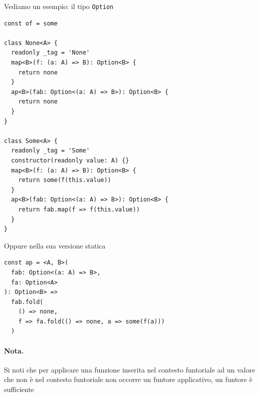 \documentclass[12pt]{article}
\begin{document}
Vediamo un esempio: il tipo \texttt{Option}

\begin{verbatim}
const of = some

class None<A> {
  readonly _tag = 'None'
  map<B>(f: (a: A) => B): Option<B> {
    return none
  }
  ap<B>(fab: Option<(a: A) => B>): Option<B> {
    return none
  }
}

class Some<A> {
  readonly _tag = 'Some'
  constructor(readonly value: A) {}
  map<B>(f: (a: A) => B): Option<B> {
    return some(f(this.value))
  }
  ap<B>(fab: Option<(a: A) => B>): Option<B> {
    return fab.map(f => f(this.value))
  }
}
\end{verbatim}

Oppure nella sua versione statica

\begin{verbatim}
const ap = <A, B>(
  fab: Option<(a: A) => B>,
  fa: Option<A>
): Option<B> =>
  fab.fold(
    () => none,
    f => fa.fold(() => none, a => some(f(a)))
  )
\end{verbatim}










\paragraph{Nota. } Si noti che per applicare una funzione inserita nel contesto funtoriale ad un valore
che non è nel contesto funtoriale non occorre un funtore applicativo, un funtore è sufficiente
\end{document}
